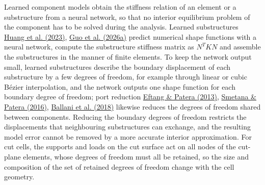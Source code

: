 \documentclass[preprint,12pt,authoryear]{elsarticle}
\begin{document}
Learned component models obtain the stiffness relation of an element or a substructure from a neural network, so that no interior equilibrium problem of the component has to be solved during the analysis. Learned substructures \href{https://doi.org/10.1016/j.eml.2023.102041}{Huang et al. (2023)}, \href{https://doi.org/10.1016/j.cma.2026.118955}{Guo et al. (2026a)} predict numerical shape functions with a neural network, compute the substructure stiffness matrix as \(N^TKN\) and assemble the substructures in the manner of finite elements. To keep the network output small, learned substructures describe the boundary displacement of each substructure by a few degrees of freedom, for example through linear or cubic Bézier interpolation, and the network outputs one shape function for each boundary degree of freedom; port reduction \href{https://doi.org/10.1002/nme.4543}{Eftang \& Patera (2013)}, \href{https://doi.org/10.1137/15m1009603}{Smetana \& Patera (2016)}, \href{https://doi.org/10.1016/j.cma.2017.09.014}{Ballani et al. (2018)} likewise reduces the degrees of freedom shared between components. Reducing the boundary degrees of freedom restricts the displacements that neighbouring substructures can exchange, and the resulting model error cannot be removed by a more accurate interior approximation. For cut cells, the supports and loads on the cut surface act on all nodes of the cut-plane elements, whose degrees of freedom must all be retained, so the size and composition of the set of retained degrees of freedom change with the cell geometry.
\end{document}
